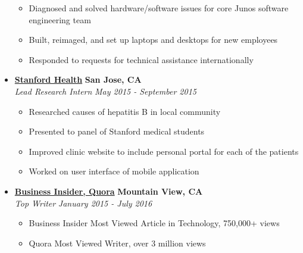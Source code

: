 \documentclass[10pt,letterpaper]{article}
\begin{document}
\begin{itemize}
    \begin{itemize}[label=\textbullet]
      \itemsep0em
      \item Diagnosed and solved hardware/software issues for core Junos software engineering team
      \item Built, reimaged, and set up laptops and desktops for new employees
      \item Responded to requests for technical assistance internationally
    \end{itemize}

    \item[]
    {\href{https://stanfordhealthcare.org/}{\textbf{Stanford Health}} \hfill
      \textbf{San Jose, CA}}
    \\
    {\emph{Lead Research Intern} \hfill \emph{May 2015 - September 2015}}

    \begin{itemize}[label=\textbullet]
      \itemsep0em
      \item Researched causes of hepatitis B in local community
      \item Presented to panel of Stanford medical students
      \item Improved clinic website to include personal portal for each of the patients
      \item Worked on user interface of mobile application
    \end{itemize}


    \item[]
    {\href{http://www.businessinsider.com/}{\textbf{Business Insider, Quora}} \hfill
      \textbf{Mountain View, CA}}
    \\
    {\emph{Top Writer} \hfill \emph{January 2015 - July 2016}}

    \begin{itemize}[label=\textbullet]
      \itemsep0em
      \item Business Insider Most Viewed Article in Technology, 750,000+ views
      \item Quora Most Viewed Writer, over 3 million views
    \end{itemize}
  \end{itemize}


\end{document}
